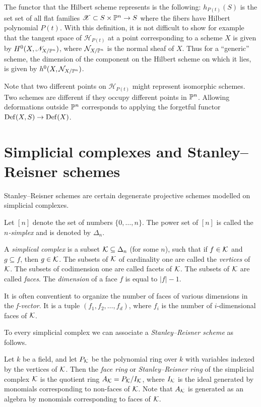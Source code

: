 The functor that the Hilbert scheme represents is the following: $h_{P(t)}(S)$ is the set set of all flat families $\mathscr X \subset S \times \P^n  \to S$ where the fibers have Hilbert polynomial $P(t)$. With this definition, it is not difficult to show for example that the tangent space of $\mathscr H_{P(t)}$ at a point corresponding to a scheme $X$ is given by $H^0(X,\mathscr N_{X/\P^n})$, where $\mathcal N_{X/\P^n}$ is the normal sheaf of $X$. Thus for a ``generic'' scheme, the dimension of the component on the Hilbert scheme on which it lies, is given by $h^0(X,\mathcal N_{X/\P^n})$.

Note that two different points on $\mathscr H_{P(t)}$ might represent isomorphic schemes. Two schemes are different if they occupy different points in $\P^n$. Allowing deformations outside $\P^n$ corresponds to applying the forgetful functor $\Def(X,S) \to \Def(X)$.


\section{Simplicial complexes and Stanley--Reisner schemes}

Stanley--Reisner schemes are certain degenerate projective schemes modelled on simplicial complexes.

Let $[n]$ denote the set of numbers $\{0,\ldots,n \}$. The power set of $[n]$ is called the \emph{$n$-simplex} and is denoted by $\Delta_n$.

\begin{definition}
A \emph{simplical complex} is a subset $\K \subseteq \Delta_n$ (for some $n$), such that if $f \in \K$ and $g \subseteq f$, then $g \in \K$. The subsets of $\K$ of cardinality one are called the \emph{vertices} of $\K$. The subsets of codimension one are called {facets} of $\K$. The subsets of $\K$ are called \emph{faces}. The \emph{dimension} of a face $f$ is equal to $|f| - 1$. 
\end{definition}

It is often conventient to organize the number of faces of various dimensions in the \emph{f-vector}. It is a tuple $(f_1,f_2,\ldots,f_d)$, where $f_i$ is the number of $i$-dimensional faces of $\K$.

To every simplicial complex we can associate a \emph{Stanley--Reisner scheme} as follows.

Let $k$ be a field, and let $P_\K$ be the polynomial ring over $k$ with variables indexed by the vertices of $\K$. Then the \emph{face ring} or \emph{Stanley--Reisner ring} of the simplicial complex $\K$ is the quotient ring $A_\K = P_\K/I_\K$, where $I_\K$ is the ideal generated by monomials corresponding to non-faces of $\K$. Note that $A_\K$ is generated as an algebra by monomials corresponding to faces of $\K$.

